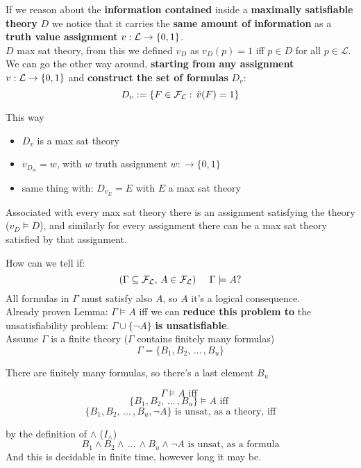 
	If we reason about the \textbf{information contained} inside a \textbf{maximally satisfiable theory} $D$ we notice that it carries the \textbf{same amount of information} as a \textbf{truth value assignment} $v: \mathcal{L} \rightarrow \{0,1\}$.\\

	$D$ max sat theory, from this we defined $v_D$ as $v_D (p) = 1$ iff $p \in D$ for all $p \in \mathcal{L}$. We can go the other way around, \textbf{starting from any assignment} $v: \mathcal{L} \rightarrow \{0,1\}$ and \textbf{construct the set of formulas} $D_v$:
	$$ D_v := \{F \in \mathcal{F}_\mathcal{L} : \, \tilde{v} (F) = 1\}$$

	This way
	\begin{itemize}
		\item $D_v$ is a max sat theory
		\item $v_{D_{w}} = w$, with $w$ truth assignment $w: \rightarrow \{0,1\}$
		\item same thing with: $D_{v_E} = E$ with $E$ a max sat theory
	\end{itemize}

	Associated with every max sat theory there is an assignment satisfying the theory ($v_D \models D$), and similarly for every assignment there can be a max sat theory satisfied by that assignment.\\


	\newpage

	How can we tell if:
	$$(\Gamma \subseteq \mathcal{F}_\mathcal{L}, \, A \in \mathcal{F}_\mathcal{L}) \;\;\;\;\; \Gamma \models A ?$$
	All formulas in $\Gamma$ must satisfy also $A$, so $A$ it's a logical consequence.\\

	Already proven Lemma: $\Gamma \models A$ iff we can \textbf{reduce this problem to} the unsatisfiability problem: $\Gamma \cup \{\neg A\}$ \textbf{is unsatisfiable}.\\

	Assume $\Gamma$ is a finite theory ($\Gamma$ contains finitely many formulas)
	$$ \Gamma = \{B_1, B_2, \, ... \, , B_u \} $$

	There are finitely many formulas, so there's a last element $B_u$

	$$ \Gamma \models A \text{ iff }$$
	$$ \{B_1, B_2, \, ... \, , B_u \} \models A \text{ iff } $$
	$$ \{B_1, B_2, \, ... \, , B_u, \neg A \} \text{ is unsat, as a theory, iff}$$

	by  the definition of $\wedge$ ($I_\wedge$)
	$$ B_1 \wedge B_2 \wedge \, ... \, \wedge B_u \wedge \neg A \text{ is unsat, as a formula}$$
	And this is decidable in finite time, however long it may be.\\

